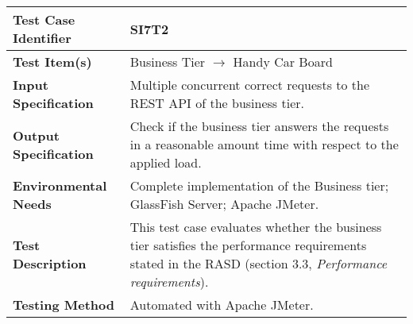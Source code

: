\vspace{2em}

\noindent\begin{tabular}{l p{}}
    \hline
    \textbf{Test Case Identifier} & SI7T2\\
    \hline
    \textbf{Test Item(s)} & Business Tier $\rightarrow$ Handy Car Board\\
    \hline
    \textbf{Input Specification} & Multiple concurrent correct requests to the REST API of the business tier.\\
    \hline
    \textbf{Output Specification} & Check if the business tier answers the requests in a reasonable amount time with respect to the applied load. \\
    \hline
    \textbf{Environmental Needs} & Complete implementation of the Business tier; GlassFish Server; Apache JMeter.\\
    \hline
    \textbf{Test Description} & This test case evaluates whether the business tier satisfies the performance requirements stated in the RASD (section 3.3, \emph{Performance requirements}).\\
    \hline
    \textbf{Testing Method} & Automated with Apache JMeter. \\
    \hline
\end{tabular}